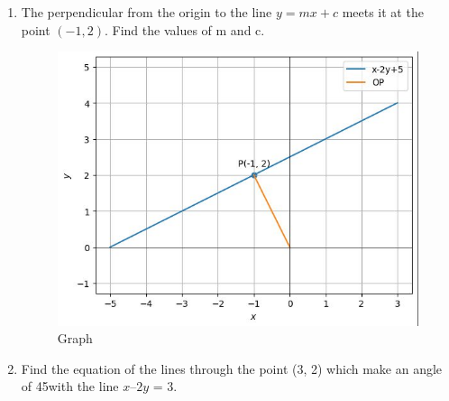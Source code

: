 \begin{enumerate}[label=\thesection.\arabic*,ref=\thesection.\theenumi]
 \item The perpendicular from the origin to the line $y=mx+c$ meets it at the point $(-1,2)$. Find the values of m and c.
 \solution
 \label{11.10.3.15}
 \begin{figure}[!ht]
 \centering
 \includegraphics[width=\columnwidth]{chapters/11/10/3/15/figs/graph.jpg}
 \caption{Graph}
 \label{fig:pic}
 \end{figure}
\item Find the equation of the lines through the point (3, 2) which make an angle of 45\degree  with the line $x – 2y$ = 3.
\label{chapters/11/10/4/11}\\
\solution
%
 
\end{enumerate}

